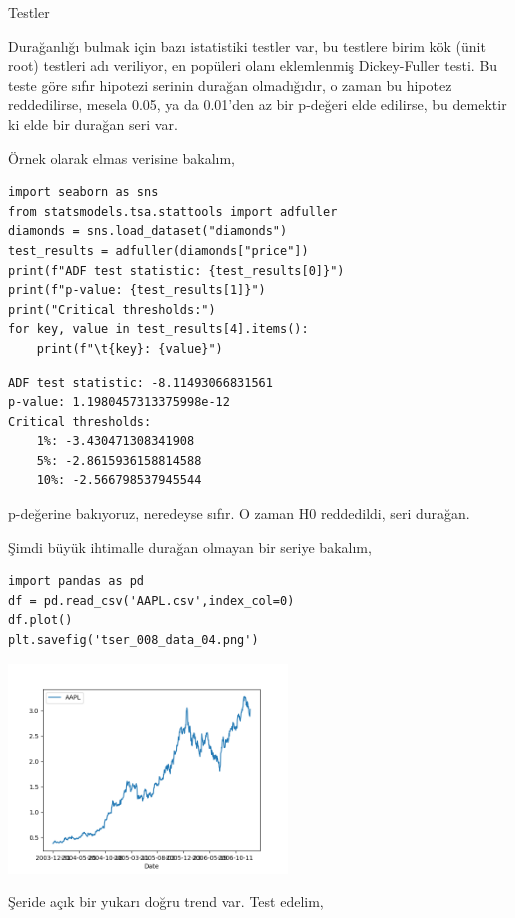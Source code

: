 \documentclass[12pt,fleqn]{article}\usepackage{../../common}
\begin{document}
Testler

Durağanlığı bulmak için bazı istatistiki testler var, bu testlere birim kök
(ünit root) testleri adı veriliyor, en popüleri olanı eklemlenmiş Dickey-Fuller
testi. Bu teste göre sıfır hipotezi serinin durağan olmadığıdır, o zaman bu
hipotez reddedilirse, mesela 0.05, ya da 0.01'den az bir p-değeri elde edilirse,
bu demektir ki elde bir durağan seri var. 

Örnek olarak elmas verisine bakalım,

\begin{verbatim}
import seaborn as sns
from statsmodels.tsa.stattools import adfuller
diamonds = sns.load_dataset("diamonds")
test_results = adfuller(diamonds["price"])
print(f"ADF test statistic: {test_results[0]}")
print(f"p-value: {test_results[1]}")
print("Critical thresholds:")
for key, value in test_results[4].items():
    print(f"\t{key}: {value}")
\end{verbatim}

\begin{verbatim}
ADF test statistic: -8.11493066831561
p-value: 1.1980457313375998e-12
Critical thresholds:
	1%: -3.430471308341908
	5%: -2.8615936158814588
	10%: -2.566798537945544
\end{verbatim}

p-değerine bakıyoruz, neredeyse sıfır. O zaman H0 reddedildi, seri durağan.

Şimdi büyük ihtimalle durağan olmayan bir seriye bakalım,

\begin{verbatim}
import pandas as pd
df = pd.read_csv('AAPL.csv',index_col=0)
df.plot()
plt.savefig('tser_008_data_04.png')
\end{verbatim}

\includegraphics[width=20em]{tser_008_data_04.png}

Şeride açık bir yukarı doğru trend var. Test edelim,
\end{document}
